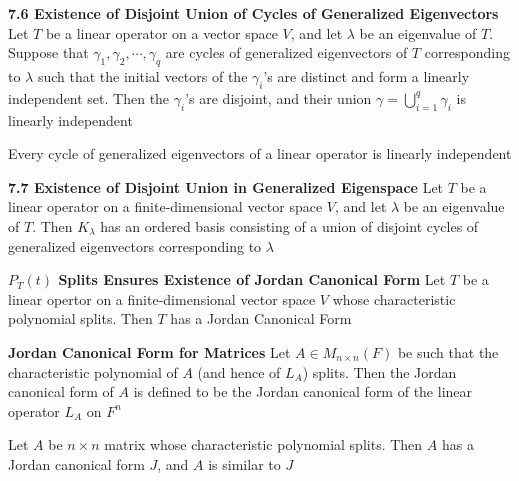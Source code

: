 \documentclass[11pt]{article}
\begin{document}
\begin{theorem*}
    \textbf{7.6 Existence of Disjoint Union of Cycles of Generalized Eigenvectors} Let $T$ be a linear operator on a vector space $V$, and let $\lambda$ be an eigenvalue of $T$. Suppose that $\gamma_1, \gamma_2, \cdots, \gamma_q$ are cycles of generalized eigenvectors of $T$ corresponding to $\lambda$ such that the initial vectors of the $\gamma_i$'s are distinct and form a linearly independent set. Then the $\gamma_i$'s are disjoint, and their union $\gamma = \bigcup_{i=1}^q \gamma_i$ is linearly independent
\end{theorem*}
 

\begin{corollary*}
    Every cycle of generalized eigenvectors of a linear operator is linearly independent
\end{corollary*}


\begin{theorem*}
    \textbf{7.7 Existence of Disjoint Union in Generalized Eigenspace} Let $T$ be a linear operator on a finite-dimensional vector space $V$, and let $\lambda$ be an eigenvalue of $T$. Then $K_{\lambda}$ has an ordered basis consisting of a union of disjoint cycles of generalized eigenvectors corresponding to $\lambda$
\end{theorem*}

\begin{corollary*}
    \textbf{$P_T(t)$ Splits Ensures Existence of Jordan Canonical Form} Let $T$ be a linear opertor on a finite-dimensional vector space $V$ whose characteristic polynomial splits. Then $T$ has a Jordan Canonical Form
\end{corollary*}

\begin{defn*}
    \textbf{Jordan Canonical Form for Matrices} Let $A\in M_{n\times n}(F)$ be such that the characteristic polynomial of $A$ (and hence of $L_A$) splits. Then the Jordan canonical form of $A$ is defined to be the Jordan canonical form of the linear operator $L_A$ on $F^n$
\end{defn*}

\begin{corollary*}
    Let $A$ be $n\times n$ matrix whose characteristic polynomial splits. Then $A$ has a Jordan canonical form $J$, and $A$ is similar to $J$
\end{corollary*}



\end{document}
